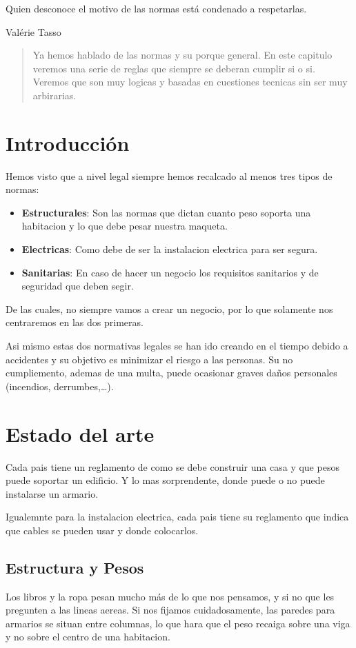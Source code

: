 
\epigraph{Quien desconoce el motivo de las normas está condenado a respetarlas.}{Valérie Tasso}

\begin{abstract}
Ya hemos hablado de las normas y su porque general. En este capitulo veremos una serie de reglas que siempre se deberan cumplir si o si. Veremos que son muy logicas y basadas en cuestiones tecnicas sin ser muy arbirarias.
\end{abstract}

\section{Introducción}
Hemos visto que a nivel legal siempre hemos recalcado al menos tres tipos de normas:
\begin{itemize}
	\item \textbf{Estructurales}: Son las normas que dictan cuanto peso soporta una habitacion y lo que debe pesar nuestra maqueta.
	\item \textbf{Electricas}: Como debe de ser la instalacion electrica para ser segura.
	\item \textbf{Sanitarias}: En caso de hacer un negocio los requisitos sanitarios y de seguridad que deben segir.
\end{itemize}
De las cuales, no siempre vamos a crear un negocio, por lo que solamente nos centraremos en las dos primeras.

Asi mismo estas dos normativas legales se han ido creando en el tiempo debido a accidentes y su objetivo es minimizar el riesgo a las personas.
Su no cumpliemento, ademas de una multa, puede ocasionar graves daños personales (incendios, derrumbes,\dots).

\section{Estado del arte}
Cada pais tiene un reglamento de como se debe construir una casa y que pesos puede soportar un edificio. Y lo mas sorprendente, donde puede o no puede instalarse un armario.

Igualemnte para la instalacion electrica, cada pais tiene su reglamento que indica que cables se pueden usar y donde colocarlos.
\subsection{Estructura y Pesos}
Los libros y la ropa pesan mucho más de lo que nos pensamos, y si no que les pregunten a las lineas aereas. Si nos fijamos cuidadosamente, las paredes para armarios se situan entre columnas, lo que hara que el peso recaiga sobre una viga y no sobre el centro de una habitacion.

